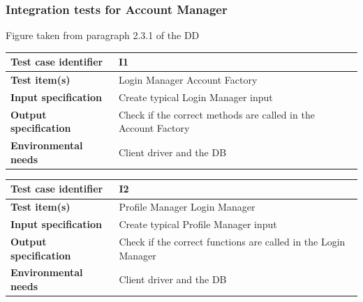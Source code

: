 \documentclass[a4paper,11pt]{report} %
\begin{document}
		\subsubsection{Integration tests for Account Manager} \label{sec:3.1.1}
		\begin{minipage}{\linewidth}
		\end{minipage}
		\begin{center}
			Figure taken from paragraph 2.3.1 of the DD
		\end{center} 
		\begin{center}
			\renewcommand{\arraystretch}{1.2}
			\setlength{\tabcolsep}{24pt}
			\begin{tabular}{ l  p{9cm}}\hline
				\textbf{Test case identifier} & I1\\\hline
				\textbf{Test item(s)} & Login Manager \textrightarrow Account Factory\\\hline
				\textbf{Input specification} & Create typical Login Manager input \\\hline
				\textbf{Output specification} & Check if the correct methods are called in the Account Factory\\\hline
				\textbf{Environmental needs} & Client driver and the DB\\\hline
			\end{tabular}
		\end{center}	
		\bigskip	
		\begin{center}
			\renewcommand{\arraystretch}{1.2}
			\setlength{\tabcolsep}{24pt}
			\begin{tabular}{ l  p{9cm}}\hline
				\textbf{Test case identifier} & I2\\\hline
				\textbf{Test item(s)} & Profile Manager \textrightarrow Login Manager\\\hline
				\textbf{Input specification} & Create typical Profile Manager input \\\hline
				\textbf{Output specification} & Check if the correct functions are called in the Login Manager\\\hline
				\textbf{Environmental needs} & Client driver and the DB\\\hline
			\end{tabular}
		\end{center}
		
\end{document}
